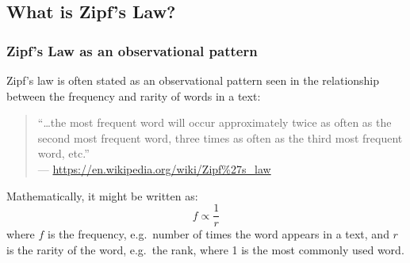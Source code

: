 \documentclass[]{article}
\date{}
\newenvironment{Shaded}{\begin{snugshade}}{\end{snugshade}}
\newcommand{\CharTok}[1]{\textcolor[rgb]{0.31,0.60,0.02}{#1}}
\newcommand{\CommentTok}[1]{\textcolor[rgb]{0.56,0.35,0.01}{\textit{#1}}}
\newcommand{\DataTypeTok}[1]{\textcolor[rgb]{0.13,0.29,0.53}{#1}}
\newcommand{\DecValTok}[1]{\textcolor[rgb]{0.00,0.00,0.81}{#1}}
\newcommand{\KeywordTok}[1]{\textcolor[rgb]{0.13,0.29,0.53}{\textbf{#1}}}
\newcommand{\NormalTok}[1]{#1}
\newcommand{\OperatorTok}[1]{\textcolor[rgb]{0.81,0.36,0.00}{\textbf{#1}}}
\newcommand{\StringTok}[1]{\textcolor[rgb]{0.31,0.60,0.02}{#1}}
\begin{document}
\begin{Shaded}
\end{Shaded}

\hypertarget{what-is-zipfs-law}{%
\subsection{What is Zipf's Law?}\label{what-is-zipfs-law}}

\hypertarget{zipfs-law-as-an-observational-pattern}{%
\subsubsection{Zipf's Law as an observational
pattern}\label{zipfs-law-as-an-observational-pattern}}

Zipf's law is often stated as an observational pattern seen in the
relationship between the frequency and rarity of words in a text:

\begin{quote}
``\ldots{}the most frequent word will occur approximately twice as often
as the second most frequent word, three times as often as the third most
frequent word, etc.''\\
--- \url{https://en.wikipedia.org/wiki/Zipf\%27s_law}
\end{quote}

Mathematically, it might be written as: \[
f \propto \frac{1}{r}
\] where \(f\) is the frequency, e.g.~number of times the word appears
in a text, and \(r\) is the rarity of the word, e.g.~the rank, where 1
is the most commonly used word.

\begin{Shaded}
\end{Shaded}
\end{document}
